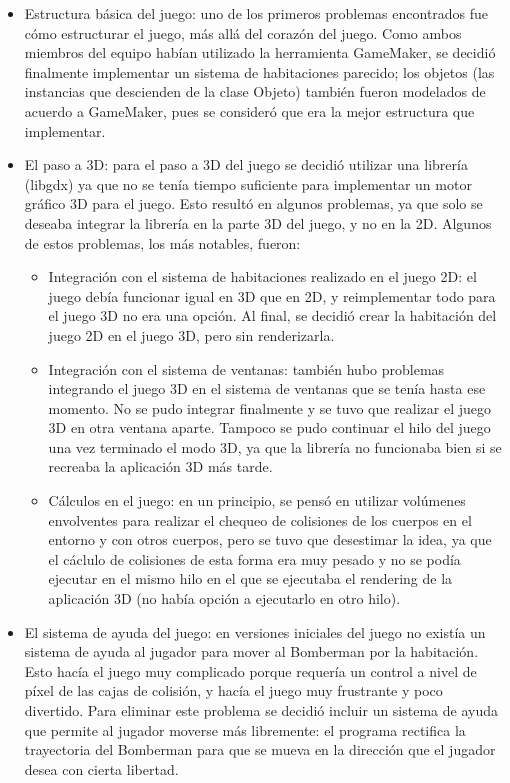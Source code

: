 \documentclass[a4paper]{article}
\begin{document}
\begin{itemize}

\item Estructura básica del juego: uno de los primeros problemas encontrados fue cómo estructurar el juego, más allá del corazón del juego. Como ambos miembros del equipo habían utilizado la herramienta GameMaker, se decidió finalmente implementar un sistema de habitaciones parecido; los objetos (las instancias que descienden de la clase Objeto) también fueron modelados de acuerdo a GameMaker, pues se consideró que era la mejor estructura que implementar.

\item El paso a 3D: para el paso a 3D del juego se decidió utilizar una librería (libgdx) ya que no se tenía tiempo suficiente para implementar un motor gráfico 3D para el juego. Esto resultó en algunos problemas, ya que solo se deseaba integrar la librería en la parte 3D del juego, y no en la 2D. Algunos de estos problemas, los más notables, fueron:

	\begin{itemize}
	\item Integración con el sistema de habitaciones realizado en el juego 2D: el juego debía funcionar igual en 3D que en 2D, y reimplementar todo para el juego 3D no era una opción. Al final, se decidió crear la habitación del juego 2D en el juego 3D, pero sin renderizarla.
	
	\item Integración con el sistema de ventanas: también hubo problemas integrando el juego 3D en el sistema de ventanas que se tenía hasta ese momento. No se pudo integrar finalmente y se tuvo que realizar el juego 3D en otra ventana aparte. Tampoco se pudo continuar el hilo del juego una vez terminado el modo 3D, ya que la librería no funcionaba bien si se recreaba la aplicación 3D más tarde.
	
	\item Cálculos en el juego: en un principio, se pensó en utilizar volúmenes envolventes para realizar el chequeo de colisiones de los cuerpos en el entorno y con otros cuerpos, pero se tuvo que desestimar la idea, ya que el cáclulo de colisiones de esta forma era muy pesado y no se podía ejecutar en el mismo hilo en el que se ejecutaba el rendering de la aplicación 3D (no había opción a ejecutarlo en otro hilo).
	\end{itemize}
	
\item El sistema de ayuda del juego: en versiones iniciales del juego no existía un sistema de ayuda al jugador para mover al Bomberman por la habitación. Esto hacía el juego muy complicado porque requería un control a nivel de píxel de las cajas de colisión, y hacía el juego muy frustrante y poco divertido. Para eliminar este problema se decidió incluir un sistema de ayuda que permite al jugador moverse más libremente: el programa rectifica la trayectoria del Bomberman para que se mueva en la dirección que el jugador desea con cierta libertad.

\end{itemize}
\newpage
\end{document}
